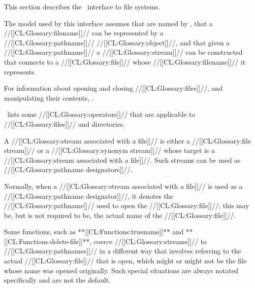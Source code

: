 



This section describes the \clisp\ interface to file systems.

The model used by this interface assumes 
     that  are named by ,
     that a //[[CL:Glossary:filename]]// can be represented by a //[[CL:Glossary:pathname]]// //[[CL:Glossary:object]]//, 
 and that given a //[[CL:Glossary:pathname]]// a //[[CL:Glossary:stream]]// can be constructed 
      that connects to a //[[CL:Glossary:file]]// whose //[[CL:Glossary:filename]]// it represents.

For information about opening and closing //[[CL:Glossary:files]]//,
and manipulating their contents, \seechapter\Streams.

\Thenextfigure\ lists some //[[CL:Glossary:operators]]// 
that are applicable to //[[CL:Glossary:files]]// and directories.



A //[[CL:Glossary:stream associated with a file]]// is either a //[[CL:Glossary:file stream]]//
or a //[[CL:Glossary:synonym stream]]// whose target is a //[[CL:Glossary:stream associated with a file]]//.
Such streams can be used as //[[CL:Glossary:pathname designators]]//.

Normally, when a //[[CL:Glossary:stream associated with a file]]// is used as a
//[[CL:Glossary:pathname designator]]//, it denotes the //[[CL:Glossary:pathname]]// used to 
open the //[[CL:Glossary:file]]//; this may be, but is not required to be, the
actual name of the //[[CL:Glossary:file]]//.

Some functions, such as **[[CL:Functions:truename]]** and **[[CL:Functions:delete-file]]**,
coerce //[[CL:Glossary:streams]]// to //[[CL:Glossary:pathnames]]// in a different way that 
involves referring to the actual //[[CL:Glossary:file]]// that is open, which might
or might not be the file whose name was opened originally.  Such special
situations are always notated specifically and are not the default.

\endsubsection%


